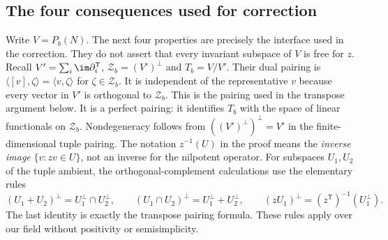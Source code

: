 \subsection{The four consequences used for correction}
Write $V=P_b(N)$. The next four properties are precisely the interface used in the
correction. They do not assert that every invariant subspace of $V$
is free for $z$.
Recall $V'=\sum_i\im\partial_i^{\mathsf T}$,
$\mathcal Z_b=(V')^\perp$ and $T_b=V/V'$. Their dual pairing is
$\langle[v],\zeta\rangle=\langle v,\zeta\rangle$ for
$\zeta\in\mathcal Z_b$. It is independent of the representative
$v$ because every vector in $V'$ is orthogonal to $\mathcal Z_b$.
This is the pairing used in the transpose argument below.
It is a perfect pairing: it identifies $T_b$ with the space of
linear functionals on $\mathcal Z_b$. Nondegeneracy follows from
$((V')^\perp)^\perp=V'$ in the finite-dimensional tuple pairing.
The notation $z^{-1}(U)$ in the proof means the \emph{inverse image}
$\{v:zv\in U\}$, not an inverse for the nilpotent operator.
For subspaces $U_1,U_2$ of the tuple ambient, the orthogonal-complement
calculations use the elementary rules
\[
 (U_1+U_2)^\perp=U_1^\perp\cap U_2^\perp,\qquad
 (U_1\cap U_2)^\perp=U_1^\perp+U_2^\perp,\qquad
 (zU_1)^\perp=(z^{\mathsf T})^{-1}(U_1^\perp).
\]
The last identity is exactly the transpose pairing formula. These
rules apply over our field without positivity or semisimplicity.

